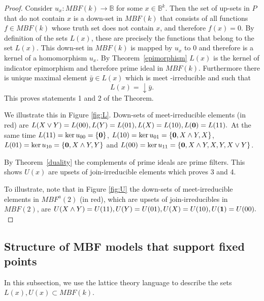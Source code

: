 \documentclass[10pt,letterpaper]{article}
\newcommand{\bbB}{\mathbb{B}}
\newcommand{\bzero}{{\bf 0}}
\newcommand{\bone}{{\bf 1}}
\begin{document}
\begin{proof}
Consider $u_x:MBF(k) \to \bbB$ for some $x\in \bbB^k$. Then the set of up-sets in $P$ that do not contain $x$ is a down-set in $MBF(k)$ that consists of all functions $f\in MBF(k)$ whose truth set does not contain $x$, and therefore $f(x)=0$. By definition of the sets $L(x)$, these are precisely the functions that belong to the set $L(x)$. This down-set in $MBF(k)$ is mapped by $u_x$ to $0$ and therefore is a kernel of a homomorphism $u_x$. %
By Theorem~\ref{epimorphism} $L(x)$ is the kernel of indicator epimorphism and therefore prime ideal in $MBF(k)$. Furthermore there is unique maximal element $\bar y \in L(x)$ which is meet -irreducible and such that 
\[ L(x) = \downarrow \bar y.\]
This proves statements 1 and 2 of the Theorem.

We illustrate this in Figure \ref{fig:L}. Down-sets of meet-irreducible elements (in red) are 
$L(X\vee Y) = L(00), L(Y) = L(01), L(X) = L(10), L(\bzero) = L(11).$
At the same time $L(11)=\ker u_{00} = \{\bzero\} $,
$L(10)=\ker u_{01} = \{\bzero, X\wedge Y, X\}$, $L(01)=\ker u_{10}=\{\bzero,X\wedge Y, Y \} $ and $L(00)=\ker u_{11}=\{\bzero,X\wedge Y, X,Y,X\vee Y \}$.


By Theorem~\ref{duality} the complements of prime ideals are prime filters. This shows $U(x)$ are upsets of join-irreducible elements which proves 3 and 4.

To illustrate, note that in Figure \ref{fig:U} the down-sets of meet-irreducible elements in $MBF^a(2)$ (in red), which are upsets of join-irreducibles in $MBF(2)$, are 
$U(X\wedge Y) = U(11), U(Y) = U(01), U(X) = U(10), U(\bone) = U(00).$ 


\end{proof}


\subsection{Structure of MBF models  that support fixed points}

In this subsection, we use the lattice theory language to describe the sets $L(x), U(x) \subset MBF(k)$.
 
\end{document}

